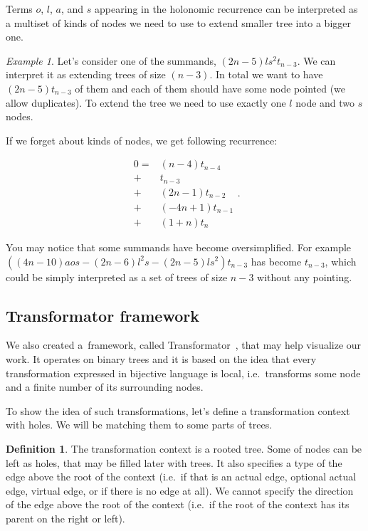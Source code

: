 \documentclass[final]{article}
\theoremstyle{definition}
\newtheorem{definition}{Definition}[subsection]
\theoremstyle{definition}
\theoremstyle{remark}
\newtheorem{example}{Example}[subsection]
\begin{document}
Terms \(o\), \(l\), \(a\), and \(s\) appearing in the holonomic recurrence can be interpreted as a multiset of kinds of nodes we need to use to extend smaller tree into a bigger one.

\begin{example}
    Let's consider one of the summands, \((2n - 5) l s^2 t_{n - 3}\). We can interpret it as extending trees of size \((n - 3)\). In total we want to have \((2n - 5) t_{n - 3}\) of them and each of them should have some node pointed (we allow duplicates). To extend the tree we need to use exactly one \(l\) node and two \(s\) nodes.
\end{example}

If we forget about kinds of nodes, we get following recurrence:

\[\begin{array}{rl}
        0 =& (n - 4) t_{n - 4}\\
        +& t_{n - 3}\\
        +& (2 n - 1) t_{n - 2}\\
        +& (-4 n + 1) t_{n - 1}\\
        +& (1 + n) t_{n}
\end{array}.\]

You may notice that some summands have become oversimplified. For example \(((4 n - 10) a o s - (2 n - 6) l^2 s - (2 n - 5) l s^2) t_{n - 3}\) has become \(t_{n-3}\), which could be simply interpreted as a set of trees of size \(n - 3\) without any pointing.

\subsection{Transformator framework}%
\label{sub:the_framework}

We also created a~framework, called Transformator~\cite{transformator}, that may help visualize our work. It operates on binary trees and it is based on the idea that every transformation expressed in bijective language is local, i.e.~transforms some node and a finite number of its surrounding nodes.

To show the idea of such transformations, let's define a transformation context with holes. We will be matching them to some parts of trees.

\begin{definition}
    The transformation context is a rooted tree. Some of nodes can be left as holes, that may be filled later with trees. It also specifies a type of the edge above the root of the context (i.e.~if that is an actual edge, optional actual edge, virtual edge, or if there is no edge at all). We cannot specify the direction of the edge above the root of the context (i.e.~if the root of the context has its parent on the right or left).
\end{definition}
\end{document}
